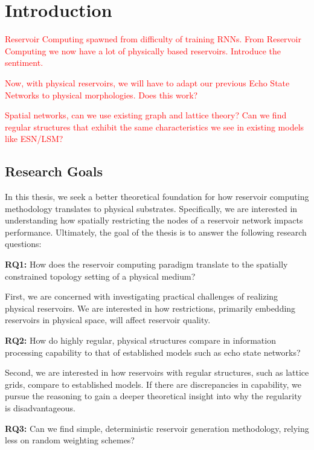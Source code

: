 \chapter{Introduction}
\label{ch:intro}

\textcolor{red}{
  Reservoir Computing spawned from difficulty of training RNNs. From Reservoir
Computing we now have a lot of physically based reservoirs. Introduce the
sentiment.
}

\textcolor{red}{
  Now, with physical reservoirs, we will have to adapt our previous Echo State
Networks to physical morphologies. Does this work?
}

\textcolor{red}{
  Spatial networks, can we use existing graph and lattice theory? Can we find
regular structures that exhibit the same characteristics we see in existing
models like ESN/LSM?
}

\section{Research Goals}

In this thesis, we seek a better theoretical foundation for how reservoir
computing methodology translates to physical substrates. Specifically, we are
interested in understanding how spatially restricting the nodes of a reservoir
network impacts performance. Ultimately, the goal of the thesis is to answer the
following research questions:

\textbf{RQ1:} How does the reservoir computing paradigm translate to the
spatially constrained topology setting of a physical medium?

First, we are concerned with investigating practical challenges of realizing
physical reservoirs. We are interested in how restrictions, primarily embedding
reservoirs in physical space, will affect reservoir quality.

\textbf{RQ2:} How do highly regular, physical structures compare in information
processing capability to that of established models such as echo state networks?

Second, we are interested in how reservoirs with regular structures, such as
lattice grids, compare to established models. If there are discrepancies in
capability, we pursue the reasoning to gain a deeper theoretical insight into
why the regularity is disadvantageous.

\textbf{RQ3:} Can we find simple, deterministic reservoir generation
methodology, relying less on random weighting schemes?

